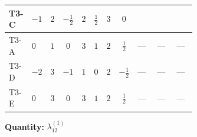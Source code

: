 \documentclass[8pt]{article}
\begin{document}
\begin{landscape}
\begin{longtable}{@{}llcccccc >{\raggedright\arraybackslash}p{0.21\linewidth} >{\raggedright\arraybackslash}p{0.21\linewidth} >{\raggedright\arraybackslash}p{0.21\linewidth}@{}}
\midrule
T3-C & $-1$ & $2$ & $-\frac{1}{2}$ & $2$ & $\frac{1}{2}$ & $3$ & $0$ & \scriptsize\adjustbox{max width=\linewidth}{$\begin{gathered} 2 {\lambda_{H H^\dagger S_1^\dagger S_2^\dagger}^{\rm Cross}} \left({\lambda_{H H^\dagger S_1^\dagger S_2^\dagger}^{\rm Cross}}\right)^{*}\end{gathered}$} & \scriptsize\adjustbox{max width=\linewidth}{$\begin{gathered} +24 {\lambda_9} \left({\lambda_9}\right)^{*}\end{gathered}$} & \scriptsize\adjustbox{max width=\linewidth}{$\begin{gathered} +9 {\lambda_{10}} (\left({\lambda_{10}}\right)^{*}+\left({\lambda_{11}}\right)^{*}) \\ +9 {\lambda_{11}} (\left({\lambda_{10}}\right)^{*}+\left({\lambda_{11}}\right)^{*})\end{gathered}$} \\
\midrule
T3-A & $0$ & $1$ & $0$ & $3$ & $1$ & $2$ & $\frac{1}{2}$ & --- & --- & --- \\
\midrule
T3-D & $-2$ & $3$ & $-1$ & $1$ & $0$ & $2$ & $-\frac{1}{2}$ & --- & --- & --- \\
\midrule
T3-E & $0$ & $3$ & $0$ & $3$ & $1$ & $2$ & $\frac{1}{2}$ & --- & --- & --- \\
\midrule
\bottomrule
\end{longtable}
\clearpage
\noindent\textbf{Quantity: }$\lambda_{12}^{(1)}$\par\smallskip

\end{landscape}
\end{document}
